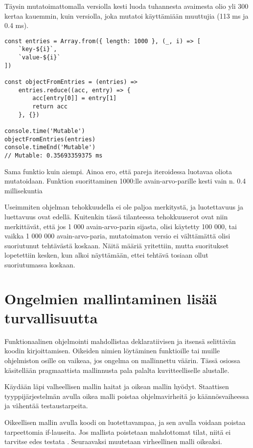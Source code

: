 Täysin mutatoimattomalla versiolla kesti luoda tuhannesta avaimesta olio yli 300 kertaa kauemmin, kuin versiolla, joka mutatoi käyttämiään muuttujia (113 ms ja 0.4 ms).


\begin{code}
    \begin{verbatim}
const entries = Array.from({ length: 1000 }, (_, i) => [
    `key-${i}`,
    `value-${i}`
])

const objectFromEntries = (entries) =>
    entries.reduce((acc, entry) => {
        acc[entry[0]] = entry[1]
        return acc
    }, {})
          
console.time('Mutable')
objectFromEntries(entries)
console.timeEnd('Mutable')
// Mutable: 0.35693359375 ms
\end{verbatim}
    \caption{Sama funktio kuin aiempi. Ainoa ero, että pareja iteroidessa luotavaa oliota mutatoidaan. Funktion suorittaminen 1000:lle avain-arvo-parille kesti vain n. 0.4 millisekuntia}
    \label{code:js_just_mutate_mutable}
\end{code}

Useimmiten ohjelman tehokkuudella ei ole paljoa merkitystä, ja luotettavuus ja luettavuus ovat edellä. Kuitenkin tässä tilanteessa tehokkuuserot ovat niin merkittävät, että jos 1 000 avain-arvo-parin sijasta, olisi käytetty 100 000, tai vaikka 1 000 000 avain-arvo-paria, mutatoimaton versio ei välttämättä olisi suoriutunut tehtävästä koskaan. Näitä määriä yritettiin, mutta suoritukset lopetettiin kesken, kun alkoi näyttämään, ettei tehtävä tosiaan ollut suoriutumassa koskaan.

\section{Ongelmien mallintaminen lisää turvallisuutta}

Funktionaalinen ohjelmointi mahdollistaa deklaratiivisen ja itsensä selittävän koodin kirjoittamisen. Oikeiden nimien löytäminen funktioille tai muille ohjelmiston osille on vaikeaa, jos ongelma on mallinnettu väärin. Tässä osiossa käsitellään pragmaattista mallinnusta pala palalta kuvitteelliselle alustalle.

Käydään läpi valheellisen mallin haitat ja oikean mallin hyödyt. Staattisen tyyppijärjestelmän avulla oikea malli poistaa ohjelmavirheitä jo käännösvaiheessa ja vähentää testaustarpeita.

Oikeellisen mallin avulla koodi on luotettavampaa, ja sen avulla voidaan poistaa tarpeettomia if-lauseita. Jos mallista poistetaan mahdottomat tilat, niitä ei tarvitse edes testata \cite{impossiblebetter}. Seuraavaksi muutetaan virheellinen malli oikeaksi.

